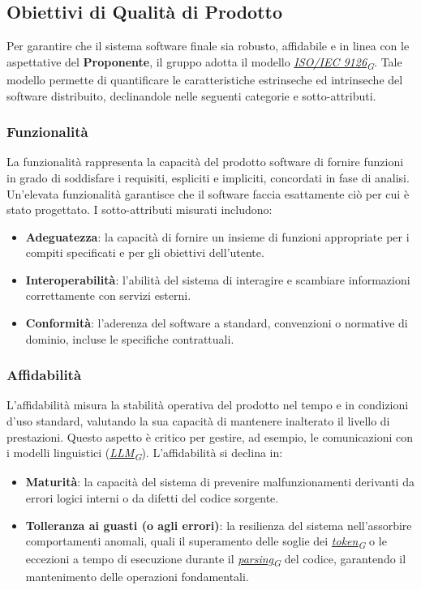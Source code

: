 \documentclass[12pt, a4paper]{article}
\newcommand{\urlglossario}{https://skynetunigroup.github.io/Code_Guardian/Documentazione/PB/glossario_v2.0.0.pdf} %
\newcommand{\glo}[2]{\href{\urlglossario\#nameddest=#2}{#1\textsubscript{G}}}
\begin{document}
\subsection{Obiettivi di Qualità di Prodotto}
Per garantire che il sistema software finale sia robusto, affidabile e in linea con le aspettative del \textbf{Proponente}, il gruppo adotta il modello \textit{\glo{ISO/IEC 9126}{iso-iec-9126}}. Tale modello permette di quantificare le caratteristiche estrinseche ed intrinseche del software distribuito, declinandole nelle seguenti categorie e sotto-attributi.

\subsubsection{Funzionalità}
La funzionalità rappresenta la capacità del prodotto software di fornire funzioni in grado di soddisfare i requisiti, espliciti e impliciti, concordati in fase di analisi. Un'elevata funzionalità garantisce che il software faccia esattamente ciò per cui è stato progettato. I sotto-attributi misurati includono:
\begin{itemize}
    \item \textbf{Adeguatezza}: la capacità di fornire un insieme di funzioni appropriate per i compiti specificati e per gli obiettivi dell'utente.
    \item \textbf{Interoperabilità}: l'abilità del sistema di interagire e scambiare informazioni correttamente con servizi esterni.
    \item \textbf{Conformità}: l'aderenza del software a standard, convenzioni o normative di dominio, incluse le specifiche contrattuali.
\end{itemize}

\subsubsection{Affidabilità}
L'affidabilità misura la stabilità operativa del prodotto nel tempo e in condizioni d'uso standard, valutando la sua capacità di mantenere inalterato il livello di prestazioni. Questo aspetto è critico per gestire, ad esempio, le comunicazioni con i modelli linguistici (\textit{\glo{LLM}{llm}}). L'affidabilità si declina in:
\begin{itemize}
    \item \textbf{Maturità}: la capacità del sistema di prevenire malfunzionamenti derivanti da errori logici interni o da difetti del codice sorgente.
    \item \textbf{Tolleranza ai guasti (o agli errori)}: la resilienza del sistema nell'assorbire comportamenti anomali, quali il superamento delle soglie dei \textit{\glo{token}{token}} o le eccezioni a tempo di esecuzione durante il \textit{\glo{parsing}{parsing}} del codice, garantendo il mantenimento delle operazioni fondamentali.
\end{itemize}
\end{document}
